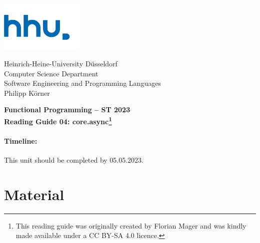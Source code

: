 \documentclass[11pt,a4paper]{article}
\begin{document}
\begin{minipage}[b]{\textwidth}
	\parbox[t]{5cm}{%
		\includegraphics[width=4cm]{unilogo}
		\hfill
	}
	\parbox[b]{11cm}{%
		Heinrich-Heine-University D\"usseldorf\\
		Computer Science Department\\
		Software Engineering and Programming Languages\\
		Philipp K\"orner %
	}
\end{minipage}
\begin{center}
	\bf
	Functional Programming -- ST 2023\\
    Reading Guide 04: core.async\footnote{This reading guide was originally created by Florian Mager and was kindly made available under a CC BY-SA 4.0 licence.}
\end{center}

\pagestyle{empty}

\paragraph{Timeline:} This unit should be completed by 05.05.2023.

\section{Material} 
\end{document}
